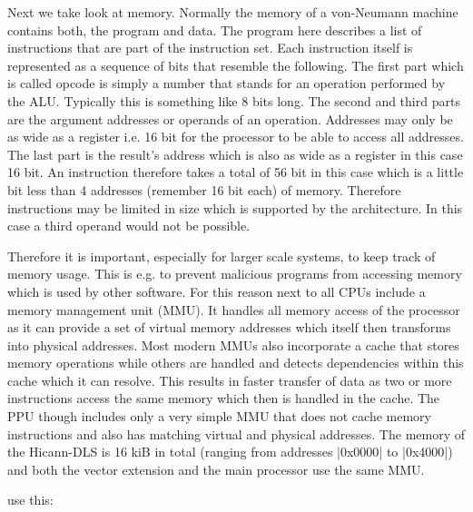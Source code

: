 Next we take look at memory.
Normally the memory of a von-Neumann machine contains both, the program and data.
The program here describes a list of instructions that are part of the instruction set.
Each instruction itself is represented as a sequence of bits that resemble the following.
The first part which is called opcode is simply a number that stands for an operation performed by the ALU.
Typically this is something like 8 bits long.
The second and third parts are the argument addresses or operands of an operation.
Addresses may only be as wide as a register i.e. 16 bit for the processor to be able to access all addresses.
The last part is the result's address which is also as wide as a register in this case 16 bit.
An instruction therefore takes a total of 56 bit in this case which is a little bit less than 4 addresses (remember 16 bit each) of memory.
Therefore instructions may be limited in size which is supported by the architecture.
In this case a third operand would not be possible.

Therefore it is important, especially for larger scale systems, to keep track of memory usage.
This is e.g. to prevent malicious programs from accessing memory which is used by other software.
For this reason next to all CPUs include a memory management unit (MMU).
It handles all memory access of the processor as it can provide a set of virtual memory addresses which itself then transforms into physical addresses.
Most modern MMUs also incorporate a cache that stores memory operations while others are handled and detects dependencies within this cache which it can resolve.
This results in faster transfer of data as two or more instructions access the same memory which then is handled in the cache.
The PPU though includes only a very simple MMU that does not cache memory instructions and also has matching virtual and physical addresses.
The memory of the Hicann-DLS is 16 kiB in total (ranging from addresses |0x0000| to |0x4000|) and both the vector extension and the main processor use the same MMU.

use this:

